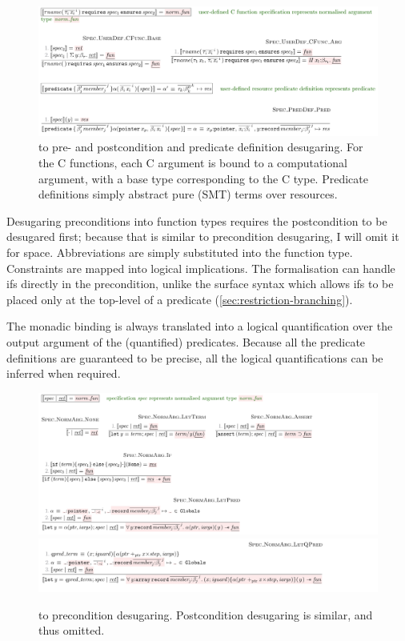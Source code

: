 \begin{figure}[tp]
    \includegraphics{figures/prepost-to-kernel}
    \caption{ to  pre- and postcondition and predicate
        definition desugaring. For the C functions, each C argument is bound to
        a computational argument, with a base type corresponding to the C type.
        Predicate definitions simply abstract pure (SMT) terms over
        resources.}\label{fig:prepost-to-kernel}
\end{figure}

Desugaring preconditions into function types requires the postcondition to be
desugared first; because that is similar to precondition desugaring, I will
omit it for space. Abbreviations are simply substituted into the function
type.\label{sn:abbrev}
Constraints are mapped into logical implications. The formalisation can handle
ifs directly in the precondition, unlike the surface syntax which allows ifs to be placed
only at the top-level of a predicate (\cref{sec:restriction-branching}).

The monadic binding  is always translated into a logical %
quantification over the output argument of the (quantified) predicates. Because
all the predicate definitions are guaranteed to be precise, all the logical
quantifications can be inferred when required.

\begin{figure}[tp]
    \includegraphics{figures/preconditions-to-kernel-1}
    \includegraphics{figures/preconditions-to-kernel-2}
    \caption{ to  precondition desugaring.
        Postcondition desugaring is similar, and thus omitted.}\label{fig:precond-to-kernel}
\end{figure}


